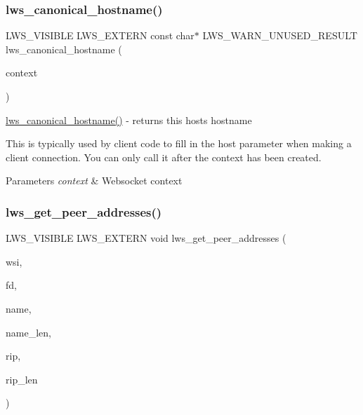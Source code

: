 \subsubsection{\texorpdfstring{lws\+\_\+canonical\+\_\+hostname()}{lws\_canonical\_hostname()}}
{\footnotesize\ttfamily L\+W\+S\+\_\+\+V\+I\+S\+I\+B\+LE L\+W\+S\+\_\+\+E\+X\+T\+E\+RN const char$\ast$ L\+W\+S\+\_\+\+W\+A\+R\+N\+\_\+\+U\+N\+U\+S\+E\+D\+\_\+\+R\+E\+S\+U\+LT lws\+\_\+canonical\+\_\+hostname (\begin{DoxyParamCaption}\item[{struct \hyperlink{structlws__context}{lws\+\_\+context} $\ast$}]{context }\end{DoxyParamCaption})}

\hyperlink{group__net_gad0df22db2be9fc65a667a1e83f9a92a4}{lws\+\_\+canonical\+\_\+hostname()} -\/ returns this host\textquotesingle{}s hostname

This is typically used by client code to fill in the host parameter when making a client connection. You can only call it after the context has been created.


\begin{DoxyParams}{Parameters}
{\em context} & Websocket context \\
\hline
\end{DoxyParams}
\mbox{\label{group__net_ga092e5f473b3347f03ffeef8a950080f3}} 
\subsubsection{\texorpdfstring{lws\+\_\+get\+\_\+peer\+\_\+addresses()}{lws\_get\_peer\_addresses()}}
{\footnotesize\ttfamily L\+W\+S\+\_\+\+V\+I\+S\+I\+B\+LE L\+W\+S\+\_\+\+E\+X\+T\+E\+RN void lws\+\_\+get\+\_\+peer\+\_\+addresses (\begin{DoxyParamCaption}\item[{struct \hyperlink{structlws}{lws} $\ast$}]{wsi,  }\item[{lws\+\_\+sockfd\+\_\+type}]{fd,  }\item[{char $\ast$}]{name,  }\item[{int}]{name\+\_\+len,  }\item[{char $\ast$}]{rip,  }\item[{int}]{rip\+\_\+len }\end{DoxyParamCaption})}

